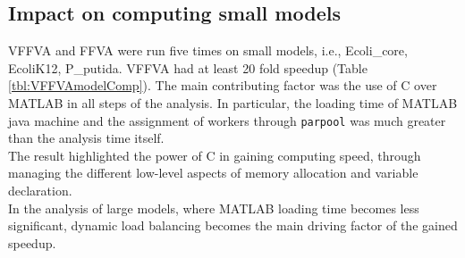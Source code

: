 \documentclass[8pt,a4paper]{book}
\begin{document}
\subsection*{Impact on computing small models}
VFFVA and FFVA were run five times on small models, i.e., Ecoli\_core, EcoliK12, P\_putida. VFFVA had at least 20 fold speedup (Table \ref{tbl:VFFVAmodelComp}). The main contributing factor was the use of C over MATLAB in all steps of the analysis. In particular, the loading time of MATLAB java machine and the assignment of workers through \texttt{parpool} was much greater than the analysis time itself.\\
The result highlighted the power of C in gaining computing speed, through managing the different low-level aspects of memory allocation and variable declaration.\\
In the analysis of large models, where MATLAB loading time becomes less significant, dynamic load balancing becomes the main driving factor of the gained speedup.\\ 
\end{document}
